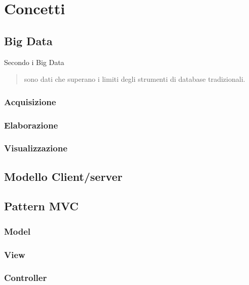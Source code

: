 \chapter{Concetti}%

\section{Big Data}\label{sec:bigdata}
Secondo \cite{rezzani2013big} i Big Data
\begin{quotation}
sono dati che superano i limiti degli strumenti di database tradizionali.
\end{quotation} 
		
\subsection{Acquisizione}
\subsection{Elaborazione}
\subsection{Visualizzazione}
\section{Modello Client/server}%
\section{Pattern MVC}
\subsection{Model}
\subsection{View}
\subsection{Controller}
	
	